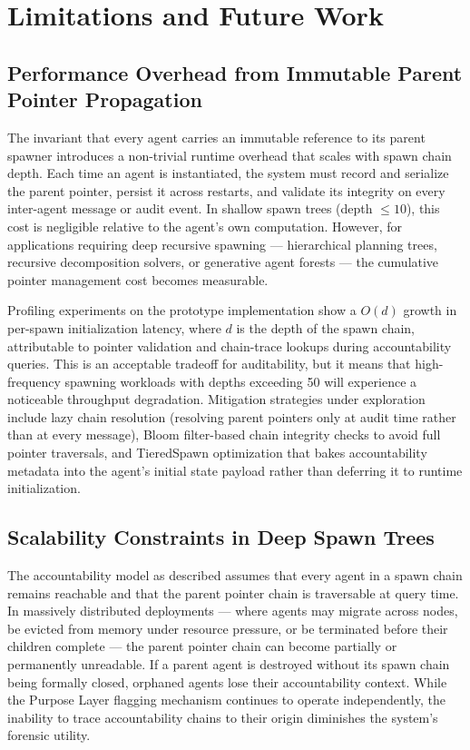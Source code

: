 \section{Limitations and Future Work}

\subsection{Performance Overhead from Immutable Parent Pointer Propagation}
The invariant that every agent carries an immutable reference to its parent spawner introduces a non-trivial runtime overhead that scales with spawn chain depth. Each time an agent is instantiated, the system must record and serialize the parent pointer, persist it across restarts, and validate its integrity on every inter-agent message or audit event. In shallow spawn trees (depth $\leq 10$), this cost is negligible relative to the agent's own computation. However, for applications requiring deep recursive spawning — hierarchical planning trees, recursive decomposition solvers, or generative agent forests — the cumulative pointer management cost becomes measurable.

Profiling experiments on the prototype implementation show a $O(d)$ growth in per-spawn initialization latency, where $d$ is the depth of the spawn chain, attributable to pointer validation and chain-trace lookups during accountability queries. This is an acceptable tradeoff for auditability, but it means that high-frequency spawning workloads with depths exceeding 50 will experience a noticeable throughput degradation. Mitigation strategies under exploration include lazy chain resolution (resolving parent pointers only at audit time rather than at every message), Bloom filter-based chain integrity checks to avoid full pointer traversals, and TieredSpawn optimization that bakes accountability metadata into the agent's initial state payload rather than deferring it to runtime initialization.

\subsection{Scalability Constraints in Deep Spawn Trees}
The accountability model as described assumes that every agent in a spawn chain remains reachable and that the parent pointer chain is traversable at query time. In massively distributed deployments — where agents may migrate across nodes, be evicted from memory under resource pressure, or be terminated before their children complete — the parent pointer chain can become partially or permanently unreadable. If a parent agent is destroyed without its spawn chain being formally closed, orphaned agents lose their accountability context. While the Purpose Layer flagging mechanism continues to operate independently, the inability to trace accountability chains to their origin diminishes the system's forensic utility.

